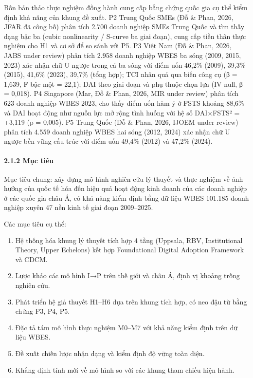 \documentclass[12pt,a4paper]{article}
\begin{document}
Bốn bản thảo thực nghiệm đồng hành cung cấp bằng chứng quốc gia cụ thể
kiểm định khả năng của khung đề xuất. P2 Trung Quốc SMEs (Đỗ \& Phan,
2026, JFAR đã công bố) phân tích 2.700 doanh nghiệp SMEs Trung Quốc và
tìm thấy dạng bậc ba (cubic nonlinearity / S-curve ba giai đoạn), cung
cấp tiền thân thực nghiệm cho H1 và cơ sở để so sánh với P5. P3 Việt Nam
(Đỗ \& Phan, 2026, JABS under review) phân tích 2.958 doanh nghiệp WBES
ba sóng (2009, 2015, 2023) xác nhận chữ U ngược trong cả ba sóng với
điểm uốn 46,2\% (2009), 39,3\% (2015), 41,6\% (2023), 39,7\% (tổng hợp);
TCI nhân quả qua biến công cụ (β = 1,639, F bậc một = 22,1); DAI theo
giai đoạn và phụ thuộc chọn lựa (IV null, β = 0,018). P4 Singapore (Mar,
Đỗ \& Phan, 2026, MIR under review) phân tích 623 doanh nghiệp WBES
2023, cho thấy điểm uốn hàm ý ở FSTS khoảng 88,6\% và DAI hoạt động như
nguồn lực mở rộng tình huống với hệ số DAI×FSTS² = +3,119 (p = 0,005).
P5 Trung Quốc (Đỗ \& Phan, 2026, IJOEM under review) phân tích 4.559
doanh nghiệp WBES hai sóng (2012, 2024) xác nhận chữ U ngược bền vững
cấu trúc với điểm uốn 49,4\% (2012) và 47,2\% (2024).

\hypertarget{212-mux1ee5c-tiuxeau}{%
\paragraph{2.1.2 Mục tiêu}\label{212-mux1ee5c-tiuxeau}}

Mục tiêu chung: xây dựng mô hình nghiên cứu lý thuyết và thực nghiệm về
ảnh hưởng của quốc tế hóa đến hiệu quả hoạt động kinh doanh của các
doanh nghiệp ở các quốc gia châu Á, có khả năng kiểm định bằng dữ liệu
WBES 101.185 doanh nghiệp xuyên 47 nền kinh tế giai đoạn 2009--2025.

Các mục tiêu cụ thể:

\begin{enumerate}
\def\labelenumi{\arabic{enumi}.}
\item
  Hệ thống hóa khung lý thuyết tích hợp 4 tầng (Uppsala, RBV,
  Institutional Theory, Upper Echelons) kết hợp Foundational Digital
  Adoption Framework và CDCM.
\item
  Lược khảo các mô hình I→P trên thế giới và châu Á, định vị khoảng
  trống nghiên cứu.
\item
  Phát triển hệ giả thuyết H1--H6 dựa trên khung tích hợp, có neo đậu từ
  bằng chứng P3, P4, P5.
\item
  Đặc tả tám mô hình thực nghiệm M0--M7 với khả năng kiểm định trên dữ
  liệu WBES.
\item
  Đề xuất chiến lược nhận dạng và kiểm định độ vững toàn diện.
\item
  Khẳng định tính mới về mô hình so với các khung tham chiếu hiện hành.
\end{enumerate}
\end{document}
